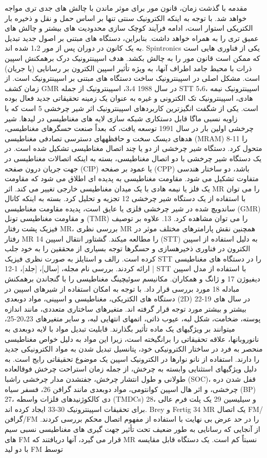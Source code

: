 مقدمه با گذشت زمان، قانون مور برای موثر ماندن با چالش های جدی تری مواجه خواهد شد. با توجه به اینکه الکترونیک سنتی تنها بر اساس حمل و نقل و ذخیره بار الکتریکی استوار است، ادامه فرآیند کوچک سازی محدودیت های بیشتر و چالش های عمیق تری را به همراه خواهد داشت. بنابراین، دستگاه های مبتنی بر اصول جدید تبدیل به یک کانون در دوران پس از مور 1،2 شده اند. Spintronics یکی از فناوری هایی است که ممکن است قانون مور را به چالش بکشد. هدف اسپینترونیک درک برهمکنش اسپین ذرات با محیط جامد اطراف آنها، به ویژه تأثیر اسپین الکترون بر رسانایی (یا جریان) است. مشکل اصلی در اسپینترونیک ساخت دستگاه های مبتنی بر اسپینترونیک است. از زمان کشف GMR در سال 1988 3،4، اسپینترونیک از جمله STT 5،6، اسپینترونیک نیمه هادی، اسپینترونیک تک الکترونی و غیره به عنوان یک زمینه تحقیقاتی جدید فعال بوده است. یکی از شگفت انگیزترین کاربردهای اسپینترونیک اثر شیر چرخشی 5 است که با زاویه نسبی ماگا قابل دستکاری شبکه سازی لایه های مغناطیسی در لیدها. شیر چرخشی اولین بار در سال 1991 توسعه یافت، که بعداً صنعت حسگرهای مغناطیسی، هدهای دیسک سخت و حافظههای دسترسی تصادفی مغناطیسی (MRAM) 8-11 را متحول کرد. دستگاه شیر چرخشی از دو یا چند اتصال مغناطیسی تشکیل شده است. در یک دستگاه شیر چرخشی با دو اتصال مغناطیسی، بسته به اینکه اتصالات مغناطیسی در جهت جریان درون صفحه (CIP) یا عمود بر صفحه (CPP) باشد، دو ساختار هندسی متفاوت تشکیل می شود. مقاومت مغناطیسی به پدیده ای اطلاق می شود که مقاومت یک فلز یا نیمه هادی با یک میدان مغناطیسی خارجی تغییر می کند. اثر MR را می توان با استفاده از یک دستگاه شیر چرخشی 12 تجزیه و تحلیل کرد. بسته به اینکه کانال ساندویچ شده در شیر چرخشی فلزی یا عایق است، پدیده مقاومت مغناطیسی (GMR) و مقاومت مغناطیسی تونل (TMR) را می توان مشاهده کرد. 13. علاوه بر توصیف فیزیک پشت رفتار MR، بررسی نظری MR همچنین نقش پارامترهای مختلف موثر در رفتار MR 14 را مطالعه میکند. گشتاور انتقال اسپین (STT) به دلیل استفاده از اسپین الکترون در فناوری ذخیرهسازی و حسگرها توجه بسیاری از محققین را به خود جلب کرده است. رالف و استایلز به صورت نظری فیزیک STT را در دستگاه های مغناطیسی ارائه کردند. بررسی نام مجله، [سال]، [جلد]، 1-12 | STT با استفاده از مدل اسپین دیفیوژن 17 و ژانگ و همکاران. مکانیسم سوئیچینگ مغناطیسی را با گنجاندن برهمکنش مبادله 18 مورد بررسی قرار داد. با توجه به امکان استفاده از شیرهای اسپین در دستگاه های الکتریکی، مغناطیسی و اسپینی، مواد دوبعدی (2D) در سال های 19-22 بیشتر و بیشتر مورد توجه قرار گرفته اند. متغیرهای ساختاری متعددی، مانند اندازه پوسته، ضخامت، شکل لبه، عیوب ذاتی، اتمهای انتهایی لبه، و سایر متغیرهای 20،23-25، میتوانند بر ویژگیهای یک ماده تأثیر بگذارند. قابلیت تبدیل مواد با لایه دوبعدی به نانوروبانها، علاقه تحقیقاتی را برانگیخته است، زیرا این مواد به دلیل خواص مغناطیسی منحصر به فرد در ساختار الکترونیکی خود، پتانسیل تبدیل شدن به مواد الکترونیکی جدید را دارند. استفاده از نانو نوارها در الکترونیک اسپین یک موضوع تحقیقاتی رایج است. به دلیل ویژگیهای استثنایی وابسته به چرخش، از جمله زمان استراحت چرخش فوقالعاده طولانی و طول انتشار چرخش، جفتشدن مدار چرخشی راشبا (SOC)، قفل شدن دره چرخشی، و اثر هال اسپین کوانتومی، مواد دوبعدی مانند گرافن 26، فسفر سیاه (BP) 27، دی کالکوژنیدهای فلزات واسطه (TMDCs) 28، و سیلیسین 29 یک پلت فرم عالی برای تحقیقات اسپینترونیک 30-33 ایجاد کرده اند. Brey و Fertig 34 MR یک اتصال FM/گرافن/FM را در حد عرض بی نهایت با استفاده از مفهوم اتصال محکم بررسی کردند. از آنجایی که رسانایی به طور ضعیف تحت تأثیر جهت گیری های مغناطیسی نسبی سیم های FM قرار می گیرد، آنها دریافتند که MR نسبتاً کم است. یک دستگاه قابل مقایسه با دو لید FM توسط 